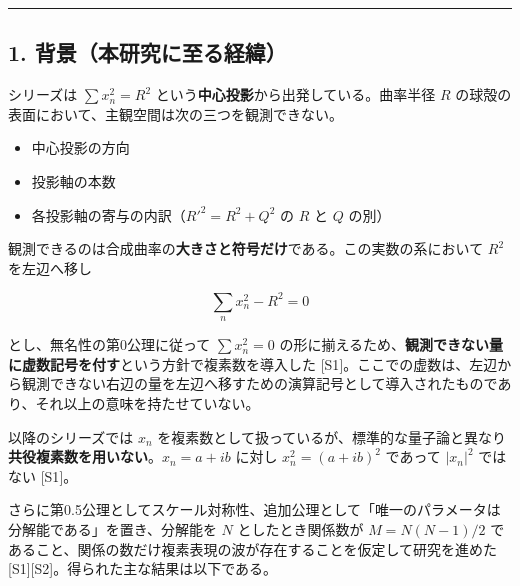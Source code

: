 \documentclass[
  10pt,
]{ltjsarticle}
\providecommand{\tightlist}{%
  \setlength{\itemsep}{0pt}\setlength{\parskip}{0pt}}
\begin{document}
\begin{center}\rule{0.5\linewidth}{0.5pt}\end{center}

\subsection{1.
背景（本研究に至る経緯）}\label{ux80ccux666fux672cux7814ux7a76ux306bux81f3ux308bux7d4cux7def}

シリーズは \(\sum x_n^2 = R^2\)
という\textbf{中心投影}から出発している。曲率半径 \(R\)
の球殻の表面において、主観空間は次の三つを観測できない。

\begin{itemize}
\tightlist
\item
  中心投影の方向
\item
  投影軸の本数
\item
  各投影軸の寄与の内訳（\(R'^2 = R^2 + Q^2\) の \(R\) と \(Q\) の別）
\end{itemize}

観測できるのは合成曲率の\textbf{大きさと符号だけ}である。この実数の系において
\(R^2\) を左辺へ移し

\[\sum_n x_n^2 - R^2 = 0\]

とし、無名性の第0公理に従って \(\sum x_n^2 = 0\)
の形に揃えるため、\textbf{観測できない量に虚数記号を付す}という方針で複素数を導入した
{[}S1{]}。ここでの虚数は、左辺から観測できない右辺の量を左辺へ移すための演算記号として導入されたものであり、それ以上の意味を持たせていない。

以降のシリーズでは \(x_n\)
を複素数として扱っているが、標準的な量子論と異なり\textbf{共役複素数を用いない}。\(x_n = a + ib\)
に対し \(x_n^2 = (a+ib)^2\) であって \(|x_n|^2\) ではない {[}S1{]}。

さらに第0.5公理としてスケール対称性、追加公理として「唯一のパラメータは分解能である」を置き、分解能を
\(N\) としたとき関係数が \(M = N(N-1)/2\)
であること、関係の数だけ複素表現の波が存在することを仮定して研究を進めた
{[}S1{]}{[}S2{]}。得られた主な結果は以下である。
\end{document}
